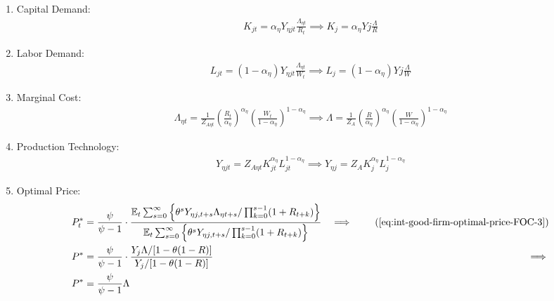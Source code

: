 \documentclass[
	12pt,
	]{article}
\numberwithin{equation}{section}
\newcommand{\E}[1][t]{{\mathbb{E}_{#1}}}
\theoremstyle{definition}
\theoremstyle{plain}
\theoremstyle{plain}
\theoremstyle{plain}
\begin{document}
\begin{enumerate}
	\item Capital Demand:
	\begin{align}
		\label{eq:ss-int-good-firm-FOC-Kt}
		K_{jt} = {\alpha_\eta} Y_{\eta jt} \frac{\Lambda_{\eta t}}{R_t} \implies 
		K_{j} = {\alpha_\eta} Y{j} \frac{\Lambda}{R}
	\end{align}
	
	\item Labor Demand:
	\begin{align}
		\label{eq:ss-int-good-firm-FOC-Lt}
		L_{jt} = (1-{\alpha_\eta}) Y_{\eta jt} \frac{\Lambda_{\eta t}}{W_t} \implies 
		L_{j} = (1-{\alpha_\eta}) Y{j} \frac{\Lambda}{W}
	\end{align}
	
	
	\item Marginal Cost:
	\begin{align}
		\label{eq:ss-int-good-firm-MC-2}
		\Lambda_{\eta t} = \frac{1}{Z_{A\eta t}} \left( \frac{R_t}{\alpha_\eta} \right)^{\alpha_\eta} \left( \frac{W_t}{1-{\alpha_\eta}} \right)^{1-{\alpha_\eta}} \implies
		\Lambda = \frac{1}{Z_{A}} \left( \frac{R}{\alpha_\eta} \right)^{\alpha_\eta} \left( \frac{W}{1-{\alpha_\eta}} \right)^{1-{\alpha_\eta}}
	\end{align}
	
	\item Production Technology:
	\begin{align}
		\label{eq:ss-int-good-firm-production-function}
		Y_{\eta jt} = Z_{A\eta t} K_{jt}^{\alpha_\eta} L_{jt}^{1-{\alpha_\eta}} \implies 
		Y_{\eta j} = Z_{A} K_{j}^{\alpha_\eta} L_{j}^{1-{\alpha_\eta}}
	\end{align}
	
	\item Optimal Price:
	\begin{alignat}{2}
		P_t^\ast &= \frac{\psi}{\psi-1} \cdot \frac{\E \sum_{s=0}^{\infty} \left\{\theta^s Y_{\eta j,t+s} \Lambda_{\eta t+s} / \prod_{k=0}^{s-1}(1+R_{t+k}) \right\}} {\E \sum_{s=0}^{\infty} \left\{ \theta^s Y_{\eta j,t+s} / \prod_{k=0}^{s-1}(1+R_{t+k}) \right\}} &\implies \tag{\ref{eq:int-good-firm-optimal-price-FOC-3}} \\
		P^\ast &= \frac{\psi}{\psi-1} \cdot \frac{ Y_j \Lambda / [1-\theta(1-R)]} {Y_j / [1-\theta(1-R)]} &\implies \nonumber \\
		P^\ast &= \frac{\psi}{\psi-1} \Lambda \label{eq:ss-int-good-firm-optimal-price-FOC-3}
	\end{alignat}
	

\end{enumerate}
\end{document}
